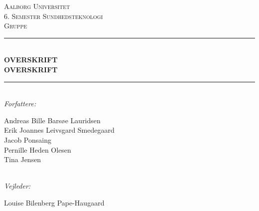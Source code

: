 \thispagestyle{empty}
\newcommand{\HRule}{\rule{\linewidth}{0.5mm}} %

\begin{center} %

\textsc{\LARGE Aalborg Universitet}\\[1.0cm] %
\textsc{\Large 6. Semester Sundhedsteknologi}\\[0.5cm] %
\textsc{\Large Gruppe }\\[0.5cm] %


\HRule \\[0.4cm]
{ \huge \bfseries OVERSKRIFT }\\[0.2cm] %
{ \huge \bfseries OVERSKRIFT}
\HRule \\[0.4cm]

\emph{Forfattere:}\\
{\large Andreas Bille Barsøe Lauridsen  \\ Erik Joannes Leivsgard Smedegaard \\ Jacob Ponsaing \\ Pernille Heden Olesen \\ Tina Jensen \par}\\[1.0cm] %

\emph{Vejleder:}\\
{\large Louise Bilenberg Pape-Haugaard \par}\\[1.0cm] %





\end{center}
